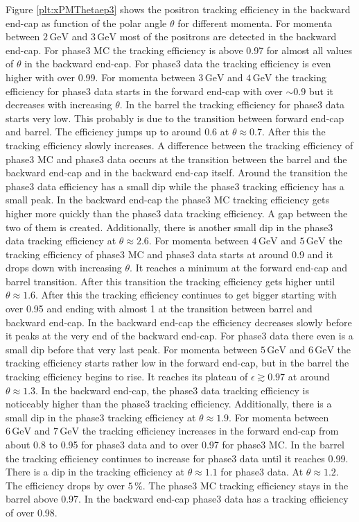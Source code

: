 \documentclass[a4paper,11pt,twosided,final,german,openbib,pdftex,listof=totoc,bibliography=totoc]{scrbook}
\begin{document}
Figure \ref{plt:xPMThetaep3} shows the positron tracking efficiency in the backward end-cap as function of the polar angle $\theta$ for different momenta.
For momenta between $2\,\textrm{GeV}$ and $3\,\textrm{GeV}$ most of the positrons are detected in the backward end-cap. For phase3 MC the tracking efficiency is above 0.97 for almost all values of $\theta$ in the backward end-cap. For phase3 data the tracking efficiency is even higher with over 0.99.
For momenta between $3\,\textrm{GeV}$ and $4\,\textrm{GeV}$ the tracking efficiency for phase3 data starts in the forward end-cap with over $\sim 0.9$ but it decreases with increasing $\theta$. In the barrel the tracking efficiency for phase3 data starts very low. This probably is due to the transition between forward end-cap and barrel. The efficiency jumps up to around 0.6 at $\theta \approx 0.7$. After this the tracking efficiency slowly increases. A difference between the tracking efficiency of phase3 MC and phase3 data occurs at the transition between the barrel and the backward end-cap and in the backward end-cap itself. Around the transition the phase3 data efficiency has a small dip while the phase3 tracking efficiency has a small peak. In the backward end-cap the phase3 MC tracking efficiency gets higher more quickly than the phase3 data tracking efficiency. A gap between the two of them is created. Additionally, there is another small dip in the phase3 data tracking efficiency at $\theta \approx 2.6$. 
For momenta between $4\,\textrm{GeV}$ and $5\,\textrm{GeV}$ the tracking efficiency of phase3 MC and phase3 data starts at around 0.9 and it drops down with increasing $\theta$. It reaches a minimum at the forward end-cap and barrel transition. After this transition the tracking efficiency gets higher until $\theta \approx 1.6$. After this the tracking efficiency continues to get bigger starting with over 0.95 and ending with almost 1 at the transition between barrel and backward end-cap. In the backward end-cap the efficiency decreases slowly before it peaks at the very end of the backward end-cap. For phase3 data there even is a small dip before that very last peak.
For momenta between $5\,\textrm{GeV}$ and $6\,\textrm{GeV}$ the tracking efficiency starts rather low in the forward end-cap, but in the barrel the tracking efficiency begins to rise. It reaches its plateau of $\epsilon \gtrsim 0.97$ at around $\theta \approx 1.3$. In the backward end-cap, the phase3 data tracking efficiency is noticeably higher than the phase3 tracking efficiency. Additionally, there is a small dip in the phase3 tracking efficiency at $\theta \approx 1.9$. 
For momenta between $6\,\textrm{GeV}$ and $7\,\textrm{GeV}$ the tracking efficiency increases in the forward end-cap from  about 0.8 to 0.95 for phase3 data and to over 0.97 for phase3 MC. In the barrel the tracking efficiency continues to increase for phase3 data until it reaches 0.99. There is a dip in the tracking efficiency at $\theta \approx 1.1$ for phase3 data. At $\theta \approx 1.2$. The efficiency drops by over $5\,\%$. The phase3 MC tracking efficiency stays in the barrel above 0.97. In the backward end-cap phase3 data has a tracking efficiency of over 0.98.
\end{document}
